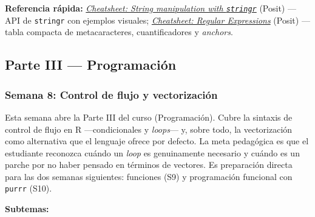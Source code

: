 \documentclass[11pt,letterpaper]{article}
\newcommand{\blue}[1]{{\color{cerulean}#1}}
\newcommand{\semana}[2]{%
  \subsubsection*{\color{main}Semana #1: #2}%
}
\newcommand{\cheatsheet}[2]{%
  \href{https://rstudio.github.io/cheatsheets/#1.pdf}{\textit{Cheatsheet: #2}}%
}
\begin{document}
\medskip
\noindent\textbf{Referencia rápida:} \cheatsheet{strings}{String manipulation with \texttt{stringr}} (Posit) ---API de \texttt{stringr} con ejemplos visuales; \cheatsheet{regex}{Regular Expressions} (Posit) ---tabla compacta de metacaracteres, cuantificadores y \textit{anchors}.

\subsection*{\color{main}Parte III --- Programación}

\semana{8}{Control de flujo y vectorización}

Esta semana abre la Parte III del curso (Programación). Cubre la sintaxis de control de flujo en R ---condicionales y \textit{loops}--- y, sobre todo, la \blue{vectorización} como alternativa que el lenguaje ofrece por defecto. La meta pedagógica es que el estudiante reconozca cuándo un \textit{loop} es genuinamente necesario y cuándo es un parche por no haber pensado en términos de vectores. Es preparación directa para las dos semanas siguientes: funciones (S9) y programación funcional con \texttt{purrr} (S10).

\textbf{Subtemas:}
\end{document}
